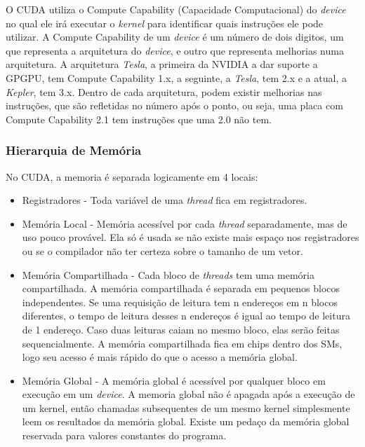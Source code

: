O CUDA utiliza o Compute Capability (Capacidade Computacional) do \textit{device} no qual ele irá executar o \textit{kernel}
para identificar quais instruções ele pode utilizar. A Compute Capability de um \textit{device} é um número de dois digitos,
um que representa a arquitetura do \textit{device}, e outro que representa melhorias numa arquitetura.
A arquitetura \textit{Tesla}, a primeira da NVIDIA a dar suporte a GPGPU, tem Compute Capability 1.x, a seguinte, a \textit{Tesla},
tem 2.x e a atual, a \textit{Kepler}, tem 3.x. Dentro de cada arquitetura, podem existir melhorias nas instruções, que são
refletidas no número após o ponto, ou seja, uma placa com Compute Capability 2.1 tem instruções que uma 2.0 não tem.

\subsubsection{Hierarquia de Memória}
No CUDA, a memoria é separada logicamente em 4 locais:

\begin{itemize}
  \item Registradores - Toda variável de uma \textit{thread} fica em registradores.
  \item Memória Local - Memória acessível por cada \textit{thread} separadamente, mas de uso pouco provável. Ela só é usada se
          não existe mais espaço nos registradores ou se o compilador não ter certeza sobre o tamanho de um vetor.
  \item Memória Compartilhada - Cada bloco de \textit{threads} tem uma memória compartilhada. A memória compartilhada é separada em
          pequenos blocos independentes. Se uma requisição de leitura tem n endereços em n blocos diferentes, o tempo de leitura
          desses n endereços é igual ao tempo de leitura de 1 endereço. Caso duas leituras caiam no mesmo bloco, elas serão
          feitas sequencialmente. A memória compartilhada fica em chips dentro dos SMs, logo seu acesso é mais rápido do que o acesso a
          memória global.
  \item Memória Global - A memória global é acessível por qualquer bloco em execução em um \textit{device}. A memoria global não é
          apagada após a execução de um kernel, então chamadas subsequentes de um mesmo kernel simplesmente leem os resultados
          da memória global. Existe um pedaço da memória global reservada para valores constantes do programa.
\end{itemize}

